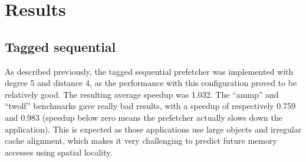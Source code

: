 \section{Results}

\subsection{Tagged sequential}

As described previously, the tagged sequential prefetcher was  implemented with
degree 5 and distance 4, as the performance  with this configuration proved to
be relatively good. The  resulting average speedup was 1.032. The ``ammp'' and
``twolf'' benchmarks gave  really bad results, with a speedup of respectively
0.759 and 0.983  (speedup below zero means the prefetcher actually slows down
the application). This is expected as those applications use large objects and
irregular cache alignment,  which makes it very challenging to predict future
memory accesses using spatial locality.

